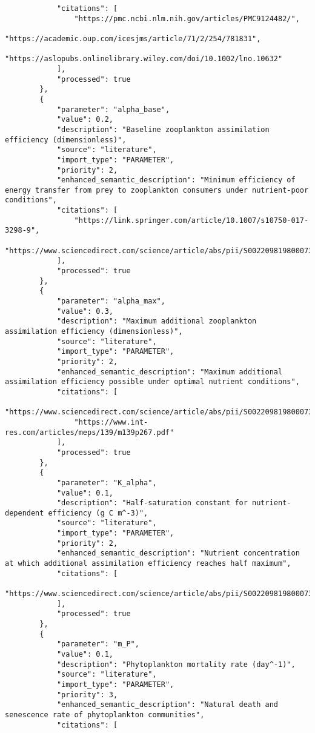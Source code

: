 \begin{lstlisting}
            "citations": [
                "https://pmc.ncbi.nlm.nih.gov/articles/PMC9124482/",
                "https://academic.oup.com/icesjms/article/71/2/254/781831",
                "https://aslopubs.onlinelibrary.wiley.com/doi/10.1002/lno.10632"
            ],
            "processed": true
        },
        {
            "parameter": "alpha_base",
            "value": 0.2,
            "description": "Baseline zooplankton assimilation efficiency (dimensionless)",
            "source": "literature",
            "import_type": "PARAMETER",
            "priority": 2,
            "enhanced_semantic_description": "Minimum efficiency of energy transfer from prey to zooplankton consumers under nutrient-poor conditions",
            "citations": [
                "https://link.springer.com/article/10.1007/s10750-017-3298-9",
                "https://www.sciencedirect.com/science/article/abs/pii/S0022098198000736"
            ],
            "processed": true
        },
        {
            "parameter": "alpha_max",
            "value": 0.3,
            "description": "Maximum additional zooplankton assimilation efficiency (dimensionless)",
            "source": "literature",
            "import_type": "PARAMETER",
            "priority": 2,
            "enhanced_semantic_description": "Maximum additional assimilation efficiency possible under optimal nutrient conditions",
            "citations": [
                "https://www.sciencedirect.com/science/article/abs/pii/S0022098198000736",
                "https://www.int-res.com/articles/meps/139/m139p267.pdf"
            ],
            "processed": true
        },
        {
            "parameter": "K_alpha",
            "value": 0.1,
            "description": "Half-saturation constant for nutrient-dependent efficiency (g C m^-3)",
            "source": "literature",
            "import_type": "PARAMETER",
            "priority": 2,
            "enhanced_semantic_description": "Nutrient concentration at which additional assimilation efficiency reaches half maximum",
            "citations": [
                "https://www.sciencedirect.com/science/article/abs/pii/S0022098198000736"
            ],
            "processed": true
        },
        {
            "parameter": "m_P",
            "value": 0.1,
            "description": "Phytoplankton mortality rate (day^-1)",
            "source": "literature",
            "import_type": "PARAMETER",
            "priority": 3,
            "enhanced_semantic_description": "Natural death and senescence rate of phytoplankton communities",
            "citations": [

\end{lstlisting}
